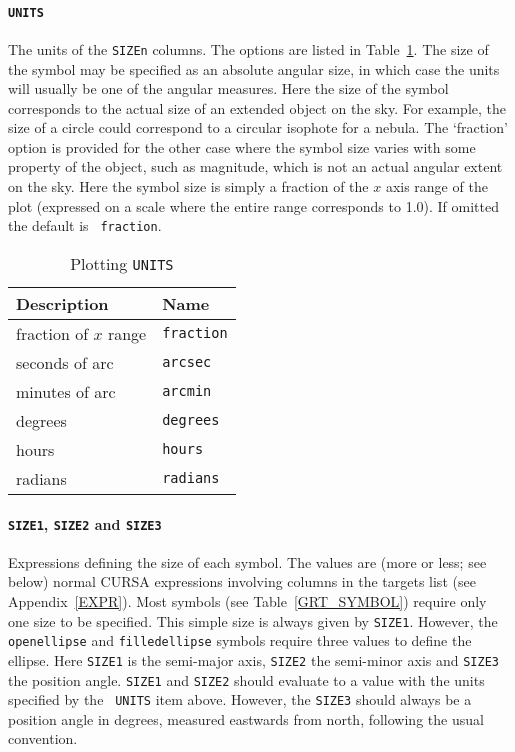 \documentclass[twoside,11pt]{article}
\renewcommand{\_}{\texttt{\symbol{95}}}
\begin{document}
\paragraph{{\tt UNITS}} The units of the {\tt SIZEn} columns.  The options
are listed in Table~\ref{GRT_UNITS}.  The size of the symbol may be
specified as an absolute angular size, in which case the units will
usually be one of the angular measures.  Here the size of the symbol
corresponds to the actual size of an extended object on the sky.  For
example, the size of a circle could correspond to a circular isophote for
a nebula.  The `fraction' option is provided for the other case where the
symbol size varies with some property of the object, such as magnitude,
which is not an actual angular extent on the sky.  Here the symbol size is
simply a fraction of the $x$\/ axis range of the plot (expressed on a scale
where the entire range corresponds to 1.0).  If omitted the default is {\tt
fraction}.

\begin{table}[htbp]

\begin{center}
\begin{tabular}{ll}
Description             & Name           \\ \hline
fraction of $x$\/ range & {\tt fraction} \\
seconds of arc          & {\tt arcsec}   \\
minutes of arc          & {\tt arcmin}   \\
degrees                 & {\tt degrees}  \\
hours                   & {\tt hours}    \\
radians                 & {\tt radians}  \\
\end{tabular}

\caption{Plotting {\tt UNITS} \label{GRT_UNITS} }
\end{center}

\end{table}


\paragraph{{\tt SIZE1}, {\tt SIZE2} and {\tt SIZE3}} Expressions defining the
size of each symbol.  The values are (more or less; see below) normal CURSA
expressions involving columns in the targets list (see Appendix~\ref{EXPR}).
Most symbols (see Table~\ref{GRT_SYMBOL}) require only one size to be
specified.  This simple size is always given by {\tt SIZE1}.  However, the
{\tt openellipse} and {\tt filledellipse} symbols require three values to
define the ellipse.  Here {\tt SIZE1} is the semi-major axis, {\tt SIZE2}
the semi-minor axis and {\tt SIZE3} the position angle.  {\tt SIZE1} and
{\tt SIZE2} should evaluate to a value with the units specified by the {\tt
UNITS} item above.  However, the {\tt SIZE3} should always be a position
angle in degrees, measured eastwards from north, following the usual
convention.
\end{document}
